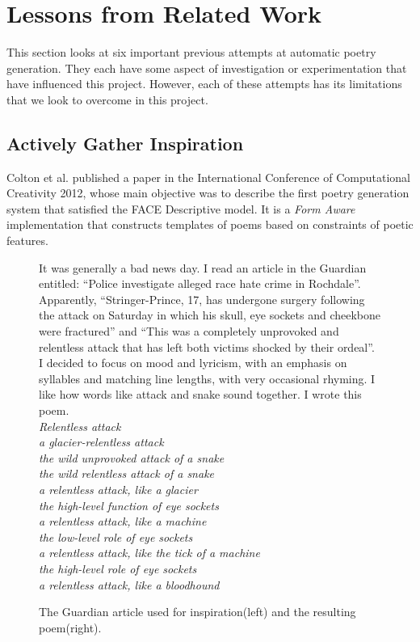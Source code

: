 \section{Lessons from Related Work}
This section looks at six important previous attempts at automatic poetry generation. They each have some aspect of investigation or experimentation that have influenced this project. However, each of these attempts has its limitations that we look to overcome in this project.

\subsection{Actively Gather Inspiration}

Colton et al. published a paper in the International Conference of Computational Creativity 2012\cite{colton2012full}, whose main objective was to describe the first poetry generation system that satisfied the FACE Descriptive model\cite{colton2011computational}. It is a \textit{Form Aware}\cite{manurung2004evolutionary} implementation that constructs templates of poems based on constraints of poetic features. 

\begin{figure}[h!]
\begin{multicols}{2}
It was generally a bad news day. I read an article in
the Guardian entitled: “Police investigate alleged race
hate crime in Rochdale”. Apparently, “Stringer-Prince,
17, has undergone surgery following the attack on
Saturday in which his skull, eye sockets and
cheekbone were fractured” and “This was a
completely unprovoked and relentless attack that has
left both victims shocked by their ordeal”. I decided to
focus on mood and lyricism, with an emphasis on
syllables and matching line lengths, with very
occasional rhyming. I like how words like attack and
snake sound together. \columnbreak
I wrote this poem.\\
\textit{Relentless attack\\
a glacier-relentless attack\\
the wild unprovoked attack of a snake\\
the wild relentless attack of a snake\\
a relentless attack, like a glacier\\
the high-level function of eye sockets\\
a relentless attack, like a machine\\
the low-level role of eye sockets\\
a relentless attack, like the tick of a machine\\
the high-level role of eye sockets\\
a relentless attack, like a bloodhound
}
\end{multicols}
\caption{The Guardian article used for inspiration(left) and the resulting poem(right).}
\label{fig:face}
\end{figure}

